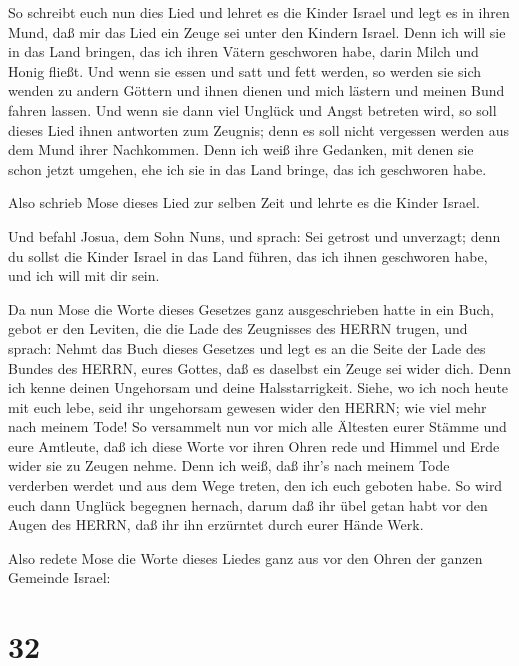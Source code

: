  So schreibt euch nun dies Lied und lehret es die Kinder
Israel und legt es in ihren Mund, daß mir das Lied ein Zeuge sei unter
den Kindern Israel.  Denn ich will sie in das Land bringen,
das ich ihren Vätern geschworen habe, darin Milch und Honig fließt. Und
wenn sie essen und satt und fett werden, so werden sie sich wenden zu
andern Göttern und ihnen dienen und mich lästern und meinen Bund fahren
lassen.  Und wenn sie dann viel Unglück und Angst betreten
wird, so soll dieses Lied ihnen antworten zum Zeugnis; denn es soll
nicht vergessen werden aus dem Mund ihrer Nachkommen. Denn ich weiß ihre
Gedanken, mit denen sie schon jetzt umgehen, ehe ich sie in das Land
bringe, das ich geschworen habe.

 Also schrieb Mose dieses Lied zur selben Zeit und lehrte
es die Kinder Israel.

 Und befahl Josua, dem Sohn Nuns, und sprach: Sei getrost
und unverzagt; denn du sollst die Kinder Israel in das Land führen, das
ich ihnen geschworen habe, und ich will mit dir sein.

 Da nun Mose die Worte dieses Gesetzes ganz ausgeschrieben
hatte in ein Buch,  gebot er den Leviten, die die Lade des
Zeugnisses des HERRN trugen, und sprach:  Nehmt das Buch
dieses Gesetzes und legt es an die Seite der Lade des Bundes des HERRN,
eures Gottes, daß es daselbst ein Zeuge sei wider dich. 
Denn ich kenne deinen Ungehorsam und deine Halsstarrigkeit. Siehe, wo
ich noch heute mit euch lebe, seid ihr ungehorsam gewesen wider den
HERRN; wie viel mehr nach meinem Tode!  So versammelt nun
vor mich alle Ältesten eurer Stämme und eure Amtleute, daß ich diese
Worte vor ihren Ohren rede und Himmel und Erde wider sie zu Zeugen
nehme.  Denn ich weiß, daß ihr's nach meinem Tode verderben
werdet und aus dem Wege treten, den ich euch geboten habe. So wird euch
dann Unglück begegnen hernach, darum daß ihr übel getan habt vor den
Augen des HERRN, daß ihr ihn erzürntet durch eurer Hände Werk.

 Also redete Mose die Worte dieses Liedes ganz aus vor den
Ohren der ganzen Gemeinde Israel:

\hypertarget{section-31}{%
\section{32}\label{section-31}}

